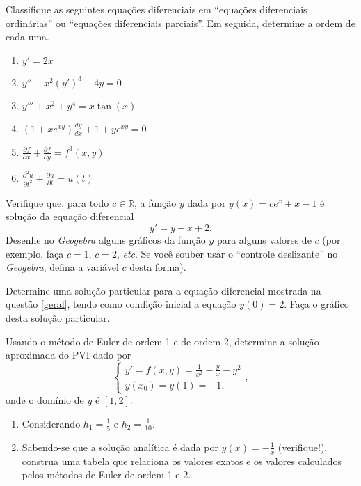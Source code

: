 
\begin{ex}
Classifique as seguintes equações diferenciais em ``equações diferenciais ordinárias'' ou ``equações diferenciais parciais''. Em seguida, determine a ordem de cada uma.
\begin{enumerate}
\item $y'=2x$
\item $y''+x^2(y')^3-4y=0$
\item $y'''+x^2+y^4=x \tan(x)$
\item $(1+xe^{xy})\frac{dy}{dx} + 1 + y e^{xy}=0$
\item $\frac{\partial f}{\partial x}+\frac{\partial f}{\partial y}=f^3(x,y)$
\item $\frac{\partial^2 u}{\partial t^2}+\frac{\partial u}{\partial t}=u(t)$
\end{enumerate}
\end{ex}

\begin{ex}\label{geral}
Verifique que, para todo $c\in\mathbb{R}$, a função $y$ dada por $y(x)=ce^x+ x-1$ é solução da equação diferencial
$$y'=y-x+2.$$
Desenhe no \emph{Geogebra} alguns gráficos da função $y$ para alguns valores de $c$ (por exemplo, faça $c=1$, $c=2$, \emph{etc}. Se você souber usar o ``controle deslizante'' no \emph{Geogebra}, defina a variável $c$ desta forma).
\end{ex}


\begin{ex}\label{part}
Determine uma solução particular para a equação diferencial mostrada na questão \ref{geral}, tendo como condição inicial a equação $y(0)=2$. Faça o gráfico desta solução particular.
\end{ex}



\begin{ex}\label{pvi1}
Usando o método de Euler de ordem 1 e de ordem 2, determine a solução aproximada do PVI dado por
$$\begin{cases}
y'=f(x,y)=\frac{1}{x^2}-\frac{y}{x} - y^2\\
y(x_0)=y(1)=-1.
\end{cases},$$
onde o domínio de $y$ é $[1,2]$.
\begin{enumerate}
\item Considerando $h_1=\frac{1}{5}$ e $h_2=\frac{1}{10}$.
\item Sabendo-se que a solução analítica é dada por $y(x)=-\frac{1}{x}$ (verifique!), construa uma tabela que relaciona os valores exatos e os valores calculados pelos métodos de Euler de ordem 1 e 2.\label{tabela}
\end{enumerate}
\end{ex}


